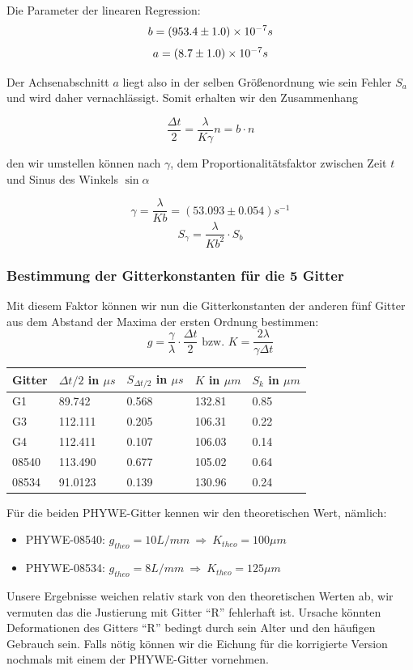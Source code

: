 Die Parameter der linearen Regression:
$$ b               = (953.4 \pm 1.0)\times 10^{-7} s $$
$$ a               = (8.7 \pm 1.0)\times 10^{-7} s $$

Der Achsenabschnitt $a$ liegt also in der selben Größenordnung wie sein Fehler $S_a$ und wird daher vernachlässigt. Somit erhalten wir den Zusammenhang

$$\frac{\Delta t}{2} = \frac{\lambda}{K\gamma}n = b\cdot n$$

den wir umstellen können nach $\gamma$, dem Proportionalitätsfaktor zwischen Zeit $t$ und Sinus des Winkels $\sin \alpha$ 

$$ \gamma = \frac{\lambda}{Kb} = (53.093 \pm 0.054) s^{-1} $$
$$S_{\gamma} = \frac{\lambda}{Kb^2} \cdot S_b $$


\subsubsection{Bestimmung der Gitterkonstanten f\"ur die 5 Gitter}

Mit diesem Faktor können wir nun die Gitterkonstanten der anderen fünf Gitter aus dem Abstand der Maxima der ersten Ordnung bestimmen:
$$ g = \frac{\gamma}{\lambda}\cdot \frac{\Delta t}{2} \text{ bzw. } K = \frac{2 \lambda }{\gamma \Delta t} $$
\begin{center}
\begin{tabular}{lllll}
\toprule 
Gitter & $\Delta t /2$ in $\mu s$ & $S_{\Delta t /2}$ in $\mu s$ & $K$ in $\mu m$ & $S_k$ in $\mu m$\\
\midrule
G1 & 89.742 & 0.568 & 132.81 & 0.85\\
G3 & 112.111 & 0.205 & 106.31 & 0.22\\
G4 & 112.411 & 0.107 & 106.03 & 0.14\\
08540 & 113.490 & 0.677 & 105.02 & 0.64\\
08534 & 91.0123 & 0.139 & 130.96 & 0.24\\
\bottomrule
\end{tabular} 
\end{center}

F\"ur die beiden PHYWE-Gitter kennen wir den theoretischen Wert, n\"amlich: 
\begin{itemize}
\item PHYWE-08540: $g_{theo} = 10 L/mm\ \Rightarrow \ K_{theo} = 100 \mu m$ 
\item PHYWE-08534: $g_{theo} = 8 L/mm\ \Rightarrow \ K_{theo} = 125 \mu m$
\end{itemize} 
Unsere Ergebnisse weichen relativ stark von den theoretischen Werten ab, wir vermuten das die Justierung mit Gitter ``R'' fehlerhaft ist. Ursache könnten Deformationen des Gitters ``R'' bedingt durch sein Alter und den häufigen Gebrauch sein. Falls nötig können wir die Eichung für die korrigierte Version nochmals mit einem der PHYWE-Gitter vornehmen.

